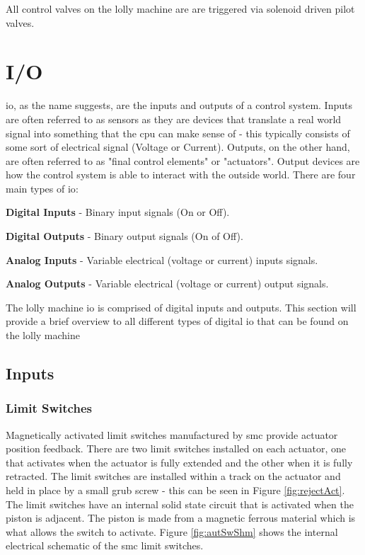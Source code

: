     All control valves on the lolly machine are are triggered via solenoid driven pilot valves.

\section{I/O}
    
    \acrfull{io}, as the name suggests, are the inputs and outputs of a control system. Inputs are often referred to as sensors as they are devices that translate a real world signal into something that the \acrshort{cpu} can make sense of - this typically consists of some sort of electrical signal (Voltage or Current). Outputs, on the other hand, are often referred to as "final control elements" or "actuators". Output devices are how the control system is able to interact with the outside world.\newline
    There are four main types of \acrshort{io}:

    \begin{description}
    \item\textbf{Digital Inputs} - Binary input signals (On or Off).
    \item\textbf{Digital Outputs} - Binary output signals (On of Off).
    \item\textbf{Analog Inputs} - Variable electrical (voltage or current) inputs signals.
    \item\textbf{Analog Outputs} - Variable electrical (voltage or current) output signals.
    \end{description}
    
    The lolly machine \acrshort{io} is comprised of digital inputs and outputs. This section will provide a brief overview to all different types of digital \acrshort{io} that can be found on the lolly machine

\subsection{Inputs}
    \subsubsection{Limit Switches}
        Magnetically activated limit switches manufactured by \acrshort{smc} provide actuator position feedback. There are two limit switches installed on each actuator, one that activates when the actuator is fully extended and the other when it is fully retracted. The limit switches are installed within a track on the actuator and held in place by a small grub screw - this can be seen in Figure \ref{fig:rejectAct}.
        The limit switches have an internal solid state circuit that is activated when the piston is adjacent. The piston is made from a magnetic ferrous material which is what allows the switch to activate. 
        Figure \ref{fig:autSwShm} shows the internal electrical schematic of the \acrshort{smc} limit switches.
        

